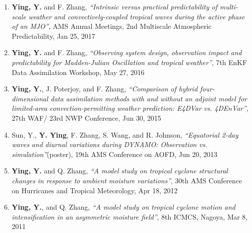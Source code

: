 \begin{enumerate}
\item \textbf{Ying, Y.} and F. Zhang,
\textit{``Intrinsic versus practical predictability of multi-scale weather and convectively-coupled tropical waves during the active phase of an MJO''},
AMS Annual Meetings, 2nd Multiscale Atmospheric Predictability, Jan 25, 2017

\item \textbf{Ying, Y.} and F. Zhang,
\textit{``Observing system design, observation impact and predictability for Madden-Julian Oscillation and tropical weather''},
7th EnKF Data Assimilation Workshop, May 27, 2016

\item \textbf{Ying, Y.}, J. Poterjoy, and F. Zhang,
\textit{``Comparison of hybrid four-dimensional data assimilation methods with and without an adjoint model for limited-area convection-permitting weather prediction: E4DVar vs. 4DEnVar''},
27th WAF/ 23rd NWP Conference, Jun 30, 2015

\item Sun, Y., \textbf{Y. Ying}, F. Zhang, S. Wang, and R. Johnson,
\textit{``Equatorial 2-day waves and diurnal variations during DYNAMO: Observation vs. simulation''}(poster),
19th AMS Conference on AOFD, Jun 20, 2013

\item \textbf{Ying, Y.} and Q. Zhang,
\textit{``A model study on tropical cyclone structural changes in response to ambient moisture variations''},
30th AMS Conference on Hurricanes and Tropical Meteorology, Apr 18, 2012

\item \textbf{Ying, Y.}, and Q. Zhang,
\textit{``A model study on tropical cyclone motion and intensification in an asymmetric moisture field''},
8th ICMCS, Nagoya, Mar 8, 2011

\end{enumerate}
